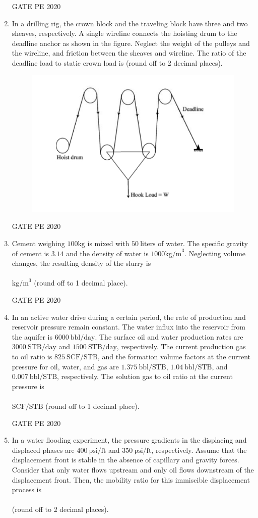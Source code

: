 \documentclass[journal,12pt,onecolumn]{IEEEtran}
\theoremstyle{remark}
\begin{document}
\begin{enumerate}
  \hfill{GATE PE 2020}
 \newpage
\item In a drilling rig, the crown block and the traveling block have three and two sheaves, respectively. A single wireline connects the hoisting drum to the deadline anchor as shown in the figure. Neglect the weight of the pulleys and the wireline, and friction between the sheaves and wireline. The ratio of the deadline load to static crown load is  (round off to 2 decimal places).
\begin{figure}[h]
    \centering
    \includegraphics[width=0.3\linewidth]{figs/10.jpeg}
    \caption{}
    \label{fig:placeholder}
\end{figure}


  \hfill{GATE PE 2020}
 
\item Cement weighing $100  \text{kg}$ is mixed with $50 \ \text{liters}$ of water. The specific gravity of cement is $3.14$ and the density of water is $1000 \text{kg/m}^3$. Neglecting volume changes, the resulting density of the slurry is \\\\ $\text{kg/m}^3$ (round off to 1 decimal place).  

  \hfill{GATE PE 2020}
 
\item In an active water drive during a certain period, the rate of production and reservoir pressure remain constant. The water influx into the reservoir from the aquifer is $6000 \ \text{bbl/day}$. The surface oil and water production rates are $3000 \ \text{STB/day}$ and $1500 \ \text{STB/day}$, respectively. The current production gas to oil ratio is $825 \ \text{SCF/STB}$, and the formation volume factors at the current pressure for oil, water, and gas are $1.375 \ \text{bbl/STB}$, $1.04 \ \text{bbl/STB}$, and $0.007 \ \text{bbl/STB}$, respectively. The solution gas to oil ratio at the current pressure is \\\\ $\text{SCF/STB}$ (round off to 1 decimal place).  

  \hfill{GATE PE 2020}
 
\item In a water flooding experiment, the pressure gradients in the displacing and displaced phases are $400 \ \text{psi/ft}$ and $350 \ \text{psi/ft}$, respectively. Assume that the displacement front is stable in the absence of capillary and gravity forces. Consider that only water flows upstream and only oil flows downstream of the displacement front. Then, the mobility ratio for this immiscible displacement process is \\\\ (round off to 2 decimal places).  


\end{enumerate}
\end{document}
